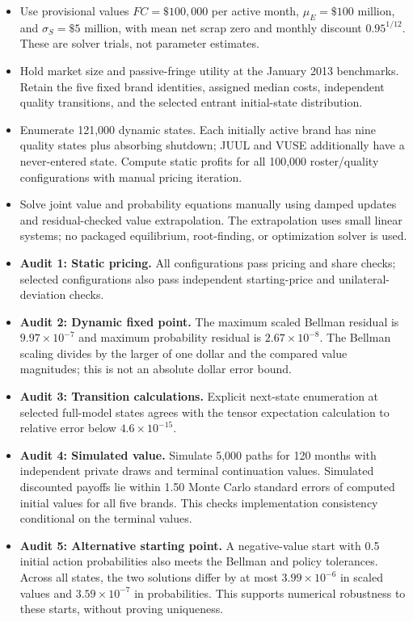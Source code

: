 \documentclass[10pt,]{article}
\begin{document}
\begin{itemize}
\item
  Use provisional values \(FC=\$100{,}000\) per active month,
  \(\mu_E=\$100\) million, and \(\sigma_S=\$5\) million, with mean net
  scrap zero and monthly discount \(0.95^{1/12}\). These are solver
  trials, not parameter estimates.
\item
  Hold market size and passive-fringe utility at the January 2013
  benchmarks. Retain the five fixed brand identities, assigned median
  costs, independent quality transitions, and the selected entrant
  initial-state distribution.
\item
  Enumerate 121,000 dynamic states. Each initially active brand has nine
  quality states plus absorbing shutdown; JUUL and VUSE additionally
  have a never-entered state. Compute static profits for all 100,000
  roster/quality configurations with manual pricing iteration.
\item
  Solve joint value and probability equations manually using damped
  updates and residual-checked value extrapolation. The extrapolation
  uses small linear systems; no packaged equilibrium, root-finding, or
  optimization solver is used.
\item
  \textbf{Audit 1: Static pricing.} All configurations pass pricing and
  share checks; selected configurations also pass independent
  starting-price and unilateral-deviation checks.
\item
  \textbf{Audit 2: Dynamic fixed point.} The maximum scaled Bellman
  residual is \(9.97\times10^{-7}\) and maximum probability residual is
  \(2.67\times10^{-8}\). The Bellman scaling divides by the larger of
  one dollar and the compared value magnitudes; this is not an absolute
  dollar error bound.
\item
  \textbf{Audit 3: Transition calculations.} Explicit next-state
  enumeration at selected full-model states agrees with the tensor
  expectation calculation to relative error below \(4.6\times10^{-15}\).
\item
  \textbf{Audit 4: Simulated value.} Simulate 5,000 paths for 120 months
  with independent private draws and terminal continuation values.
  Simulated discounted payoffs lie within 1.50 Monte Carlo standard
  errors of computed initial values for all five brands. This checks
  implementation consistency conditional on the terminal values.
\item
  \textbf{Audit 5: Alternative starting point.} A negative-value start
  with 0.5 initial action probabilities also meets the Bellman and
  policy tolerances. Across all states, the two solutions differ by at
  most \(3.99\times10^{-6}\) in scaled values and \(3.59\times10^{-7}\)
  in probabilities. This supports numerical robustness to these starts,
  without proving uniqueness.
\end{itemize}
\end{document}
